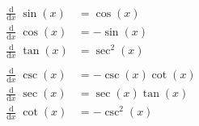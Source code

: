 \newcommand{\derivative}{{\scriptscriptstyle \frac{\mathrm{d}}{\mathrm{d}x}}\;} 
\begin{equation}
\begin{split}
    \derivative \sin(x) &= \cos(x) \\
    \derivative \cos(x) &= -\sin(x) \\
    \derivative \tan(x) &= \sec^2(x) \\
    &\\
    \derivative \csc(x) &= -\csc(x)\cot(x) \\
    \derivative \sec(x) &= \sec(x)\tan(x) \\
    \derivative \cot(x) &= -\csc^2(x)
\end{split}
\end{equation}